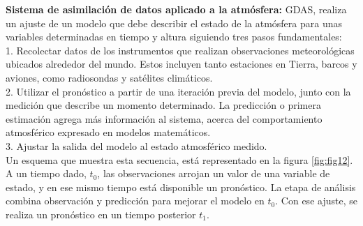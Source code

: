 \textbf{Sistema de asimilación de datos aplicado a la atmósfera: } GDAS, realiza un ajuste de un modelo que debe describir el estado de la atmósfera para unas variables determinadas en tiempo y altura siguiendo tres pasos fundamentales:\\

1. Recolectar datos de los instrumentos que realizan observaciones meteorológicas ubicados alrededor del mundo. Estos incluyen tanto estaciones en Tierra, barcos y aviones, como radiosondas y satélites climáticos.\\

2. Utilizar el pronóstico a partir de una iteración previa del modelo, junto con la medición que describe un momento determinado. La predicción o primera estimación agrega más información al sistema, acerca del comportamiento atmosférico expresado en modelos matemáticos. \\%

3. Ajustar la salida del modelo al estado atmosférico medido.\\

Un esquema que muestra esta secuencia, está representado en la figura \ref{fig:fig12}. A un tiempo dado, $ t_{0}$, las observaciones arrojan un valor de una variable de estado, y en ese mismo tiempo está disponible un pronóstico. La etapa de análisis combina observación y predicción para mejorar el modelo en $t_{0}$. Con ese ajuste, se realiza un pronóstico en un tiempo posterior $t_{1}$.

